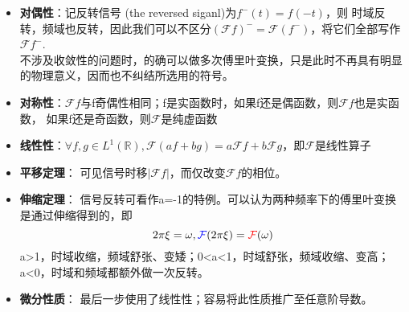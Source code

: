 \documentclass{ctexbook}
\begin{document}
\begin{itemize}
    \item \textbf{对偶性}：记反转信号 (the reversed siganl)为$f^-(t)=f(-t)$，则
          时域反转，频域也反转，因此我们可以不区分$(\mathcal{F}f)^-=\mathcal{F} (f^-)$，将它们全部写作$\mathcal{F} f^-$.\\
          不涉及收敛性的问题时，的确可以做多次傅里叶变换，只是此时不再具有明显的物理意义，因而也不纠结所选用的符号。
    \item \textbf{对称性}：$\mathcal{F} f$与f奇偶性相同；f是实函数时，如果f还是偶函数，则$\mathcal{F} f$也是实函数，
          如果f还是奇函数，则$\mathcal{F} $是纯虚函数
    \item \textbf{线性性}：$\forall f,g\in L^1(\mathbb{R}),\mathcal{F} (af+bg)=a\mathcal{F} f+b\mathcal{F} g$，即$\mathcal{F} $是线性算子
    \item \textbf{平移定理}：
          可见信号时移$|\mathcal{F} f|$，而仅改变$\mathcal{F} f$的相位。
    \item \textbf{伸缩定理}：
          信号反转可看作a=-1的特例。可以认为两种频率下的傅里叶变换是通过伸缩得到的，即
          \[2\pi\xi=\omega,\textcolor{blue}{\mathcal{F}}(2\pi\xi)=\textcolor{red}{\mathcal{F}}(\omega)\]
          a>1，时域收缩，频域舒张、变矮；0<a<1，时域舒张，频域收缩、变高；a<0，时域和频域都额外做一次反转。
    \item \textbf{微分性质}：
          最后一步使用了线性性；容易将此性质推广至任意阶导数。
\end{itemize}
\end{document}
